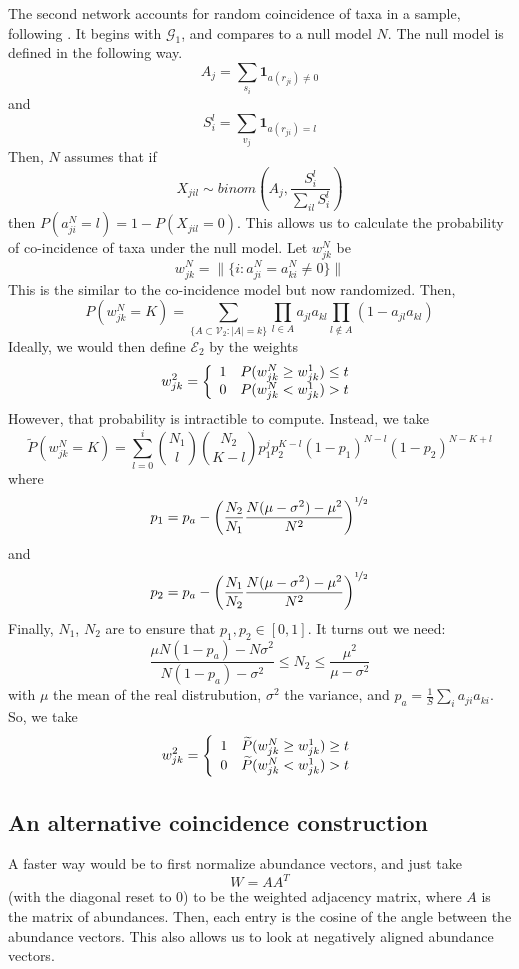\documentclass[10pt]{article}
\theoremstyle{definition}
\numberwithin{theorem}{section}
\numberwithin{definition}{section}
\numberwithin{lemma}{section}
\numberwithin{corollary}{section}
\numberwithin{clm}{section}
\numberwithin{rmk}{section}
\newcommand{\nhalf}{\nicefrac{1}{2}}
\renewcommand{\b}{\bm}
\newcommand{\cE}{\mathcal{E}}
\newcommand{\cG}{\mathcal{G}}
\newcommand{\cV}{\mathcal{V}}
\begin{document}
The second network accounts for random coincidence of taxa in a sample, following \cite{coocc}. It begins with $\cG_1$, and compares to a null model $N$. The null model is defined in the following way.
\[
A_j= \sum_{s_i} \b{1}_{a(r_{ji}) \neq 0}
\] 
and 
\[
S_i^l  = \sum_{v_j} \b{1}_{a(r_{ji}) = l}
\]
Then, $N$ assumes that if
\[
X_{jil} \sim \mathit{binom}\left(A_j, \frac{S_i^l}{\sum_{il} S_i^l}\right)
\]
then $P(a_{ji}^N = l) = 1-P(X_{jil} = 0)$. This allows us to calculate the probability of co-incidence of taxa under the null model. Let $w_{jk}^N$ be
\[
w^N_{jk} = \|\{i: a_{ji}^N = a_{ki}^N \neq 0\} \|
\]
This is the similar to the co-incidence model but now randomized. Then,
\[
P(w_{jk}^N = K) =  \sum_{\{A \subset \cV_2:|A| = k\}} \prod_{l\in A} a_{jl}a_{kl}\prod_{l \not\in A} (1- a_{jl}a_{kl})
\]
Ideally, we would then define $\cE_2$ by the weights
\[
w_{jk}^2 = \left\{ \begin{array}{c c}
1 & P(w_{jk}^N \geq w_{jk}^1) \leq t\\
0 & P(w_{jk}^N < w_{jk}^1) > t
\end{array}\right.
\]
However, that probability is intractible to compute. Instead, we take 
\[
\widetilde{P}(w_{jk}^N = K) = \sum_{l=0}^i \binom{N_1}{l}\binom{N_2}{K-l} p_1^j p_2^{K-l} (1-p_1)^{N-l}(1-p_2)^{N-K+l}
\]
where
\[
p_1 = p_a - \left(\frac{N_2}{N_1}\frac{N(\mu-\sigma^2)- \mu^2}{N^2}\right)^{\nhalf}
\]
and 
\[
p_2 = p_a - \left(\frac{N_1}{N_2}\frac{N(\mu-\sigma^2)- \mu^2}{N^2}\right)^{\nhalf}
\]
Finally, $N_1$, $N_2$ are to ensure that $p_1,p_2 \in [0,1]$. It turns out we need:
\[
\frac{\mu N (1-p_a) - N\sigma^2}{N(1-p_a)- \sigma^2} \leq N_2 \leq \frac{\mu^2}{\mu- \sigma^2}
\]
with $\mu$ the mean of the real distrubution, $\sigma^2$ the variance, and $p_a = \frac{1}{S}\sum_{i} a_{ji}a_{ki}$. So, we take 
\[
w_{jk}^2 = \left\{ \begin{array}{c c}
1 & \widetilde{P}(w_{jk}^N \geq w_{jk}^1) \geq t\\
0 & \widetilde{P}(w_{jk}^N < w_{jk}^1) > t
\end{array}\right.
\]

\subsection{An alternative coincidence construction}
A faster way would be to first normalize abundance vectors, and just take 
\[
W = AA^T
\]
(with the diagonal reset to 0) to be the weighted adjacency matrix, where $A$ is the matrix of abundances. Then, each entry is the cosine of the angle between the abundance vectors. This also allows us to look at negatively aligned abundance vectors.
\end{document}
